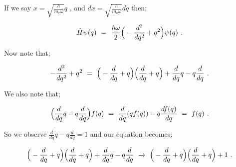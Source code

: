 \documentclass{article}
\begin{document}
If we say \begin{math} x = \sqrt{\frac{\hbar}{m_e \omega}} q \end{math} , and  \begin{math} dx = \sqrt{\frac{\hbar}{m_e \omega}} dq \end{math} then;

\begin{equation} \label{eb-eq-256-4}
\hat{H}\psi(q) \hspace{0.125cm} = \hspace{0.125cm} \frac{\hbar \omega}{2} \Big( -\frac{d^2}{dq^2} + q^2 \Big) \psi(q) \hspace{0.125cm} .
\end{equation}

Now note that;

\begin{equation} \label{eb-eq-256-5}
-\frac{d^2}{dq^2} + q^2 \hspace{0.125cm} = \hspace{0.125cm} \Big( -\frac{d}{dq} + q \Big) \Big( \frac{d}{dq} + q \Big) + \frac{d}{dq} q - q \frac{d}{dq} \hspace{0.125cm} .
\end{equation}

We also note that;

\begin{equation} \label{eb-eq-256-6}
\Big( \frac{d}{dq} q - q \frac{d}{dq} \Big) f(q) \hspace{0.125cm} = \hspace{0.125cm} \frac{d}{dq} ( q f(q) ) - q \frac{d f(q)}{dq} \hspace{0.125cm} = \hspace{0.125cm} f(q) \hspace{0.125cm} .
\end{equation}

So we observe \begin{math} \frac{d}{dq} q - q \frac{d}{dq} = 1 \end{math} and our equation becomes;

\begin{equation} \label{eb-eq-256-7}
\Big( -\frac{d}{dq} + q \Big) \Big( \frac{d}{dq} + q \Big) + \frac{d}{dq} q - q \frac{d}{dq} \hspace{0.125cm} \xrightarrow{} \hspace{0.125cm} \Big( -\frac{d}{dq} + q \Big) \Big( \frac{d}{dq} + q \Big) + 1 \hspace{0.125cm} .
\end{equation}
\end{document}

